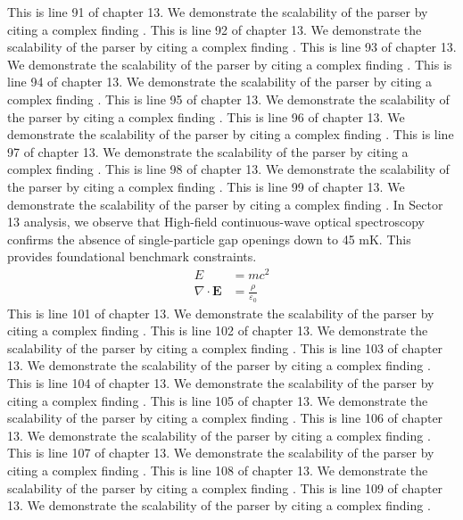 This is line 91 of chapter 13. We demonstrate the scalability of the parser by citing a complex finding \cite{ref13_91}.
This is line 92 of chapter 13. We demonstrate the scalability of the parser by citing a complex finding \cite{ref13_92}.
This is line 93 of chapter 13. We demonstrate the scalability of the parser by citing a complex finding \cite{ref13_93}.
This is line 94 of chapter 13. We demonstrate the scalability of the parser by citing a complex finding \cite{ref13_94}.
This is line 95 of chapter 13. We demonstrate the scalability of the parser by citing a complex finding \cite{ref13_95}.
This is line 96 of chapter 13. We demonstrate the scalability of the parser by citing a complex finding \cite{ref13_96}.
This is line 97 of chapter 13. We demonstrate the scalability of the parser by citing a complex finding \cite{ref13_97}.
This is line 98 of chapter 13. We demonstrate the scalability of the parser by citing a complex finding \cite{ref13_98}.
This is line 99 of chapter 13. We demonstrate the scalability of the parser by citing a complex finding \cite{ref13_99}.
In Sector 13 analysis, we observe that High-field continuous-wave optical spectroscopy confirms the absence of single-particle gap openings down to 45 mK. This provides foundational benchmark constraints.
\begin{align*}
  E &= mc^2 \\
  \nabla \cdot \mathbf{E} &= \frac{\rho}{\varepsilon_0}
\end{align*}
This is line 101 of chapter 13. We demonstrate the scalability of the parser by citing a complex finding \cite{ref13_101}.
This is line 102 of chapter 13. We demonstrate the scalability of the parser by citing a complex finding \cite{ref13_102}.
This is line 103 of chapter 13. We demonstrate the scalability of the parser by citing a complex finding \cite{ref13_103}.
This is line 104 of chapter 13. We demonstrate the scalability of the parser by citing a complex finding \cite{ref13_104}.
This is line 105 of chapter 13. We demonstrate the scalability of the parser by citing a complex finding \cite{ref13_105}.
This is line 106 of chapter 13. We demonstrate the scalability of the parser by citing a complex finding \cite{ref13_106}.
This is line 107 of chapter 13. We demonstrate the scalability of the parser by citing a complex finding \cite{ref13_107}.
This is line 108 of chapter 13. We demonstrate the scalability of the parser by citing a complex finding \cite{ref13_108}.
This is line 109 of chapter 13. We demonstrate the scalability of the parser by citing a complex finding \cite{ref13_109}.
